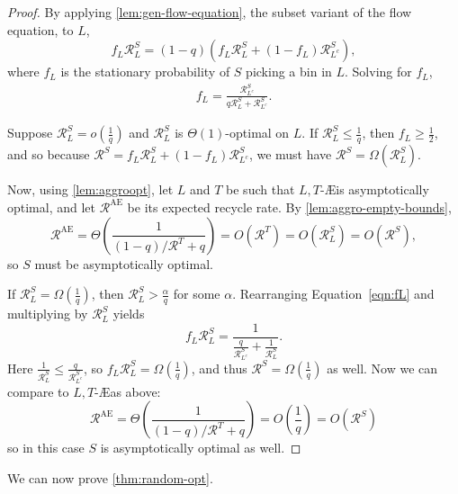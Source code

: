 \begin{proof}
	By applying \cref{lem:gen-flow-equation}, the subset variant of the
	flow equation, to $L$, 
	\[ f_L \mathcal{R}_L^S = (1-q)(f_L \mathcal{R}_L^S + (1-f_L) \mathcal{R}_{L^c}^S), \]
	where $f_L$ is the stationary probability of $S$ picking a bin in $L$.
	Solving for $f_L$,
	\begin{align} 
		f_L = \frac{\mathcal{R}_{L^c}^S}{q\mathcal{R}_L^S +
          \mathcal{R}_{L^c}^S}. \label{eqn:fL}
	\end{align}

	Suppose $\mathcal{R}_L^S = o\left(\frac{1}{q}\right)$ and $\mathcal{R}_L^S$
	is $\Theta(1)$-optimal on $L$. If $\mathcal{R}_L^S\leq \frac{1}{q}$, then
	$f_L \geq \frac{1}{2}$, and so because $\mathcal{R}^S = f_L\mathcal{R}_L^S
	+ (1-f_L)\mathcal{R}_{L^c}^S$, we must have $\mathcal{R}^S =
	\Omega(\mathcal{R}_L^S)$.

	Now, using \cref{lem:aggroopt}, let $L$ and $T$ be such that $L,T$-\AE is
	asymptotically optimal, and let $\mathcal{R}^\textrm{AE}$ be its expected
	recycle rate. By \cref{lem:aggro-empty-bounds},
        \[ \mathcal{R}^\mathrm{AE} = \Theta\left( \frac{1}{(1-q)/\mathcal{R}^T + q}\right) = O\left(\mathcal{R}^T\right) = O\left(\mathcal{R}_L^S\right) = O\left(\mathcal{R}^S\right),\label{eqn:RAE}
        \]
	so $S$ must be asymptotically optimal.

	If $\mathcal{R}_L^S = \Omega\left(\frac{1}{q}\right)$, then
	$\mathcal{R}_L^S > \frac{\alpha}{q}$ for some $\alpha$. Rearranging
	Equation~\eqref{eqn:fL} and multiplying by
	$\mathcal{R}_L^S$ yields
	\[ f_L \mathcal{R}_L^S = \frac{1}{\frac{q}{\mathcal{R}_{L^c}^S} + \frac{1}{\mathcal{R}_L^S}}. \]
	Here $\frac{1}{\mathcal{R}_L^S} \leq \frac{q}{\mathcal{R}_{L^c}^S}$, so
	$f_L\mathcal{R}_L^S = \Omega\left(\frac{1}{q}\right)$, and thus
	$\mathcal{R}^S = \Omega\left(\frac{1}{q}\right)$ as well. Now we can
	compare to $L,T$-\AE as above:
	\[ 	\mathcal{R}^\mathrm{AE}
		= \Theta\left( \frac{1}{(1-q)/\mathcal{R}^T + q}\right)
		= O\left(\frac{1}{q}\right)
		= O\left(\mathcal{R}^S\right)
		\]
	so in this case $S$ is asymptotically optimal as well.
\end{proof}	

We can now prove \cref{thm:random-opt}.

